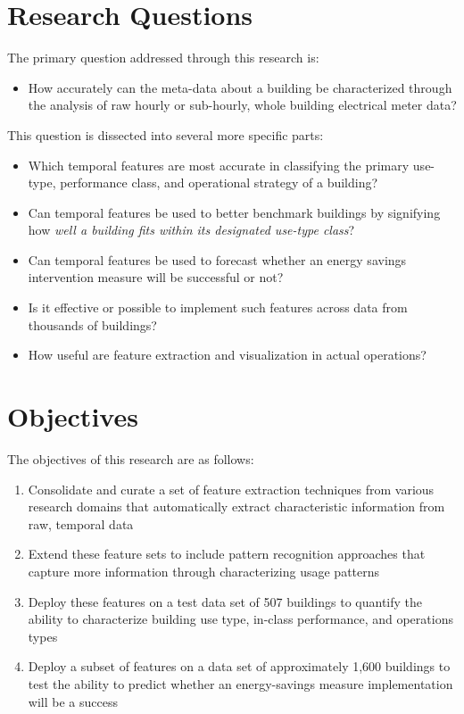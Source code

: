\section{Research Questions}
The primary question addressed through this research is:
\begin{itemize}
\item How accurately can the meta-data about a building be characterized through the analysis of raw hourly or sub-hourly, whole building electrical meter data? 
\end{itemize}

This question is dissected into several more specific parts:
\begin{itemize}
\item Which temporal features are most accurate in classifying the primary use-type, performance class, and operational strategy of a building?
\item Can temporal features be used to better benchmark buildings by signifying how \emph{well a building fits within its designated use-type class}?
\item Can temporal features be used to forecast whether an energy savings intervention measure will be successful or not?
\item Is it effective or possible to implement such features across data from thousands of buildings?
\item How useful are feature extraction and visualization in actual operations?
\end{itemize}

\section{Objectives}
The objectives of this research are as follows:
\begin{enumerate}
\item Consolidate and curate a set of feature extraction techniques from various research domains that automatically extract characteristic information from raw, temporal data
\item Extend these feature sets to include pattern recognition approaches that capture more information through characterizing usage patterns
\item Deploy these features on a test data set of 507 buildings to quantify the ability to characterize building use type, in-class performance, and operations types
\item Deploy a subset of features on a data set of approximately 1,600 buildings to test the ability to predict whether an energy-savings measure implementation will be a success 
\end{enumerate}

